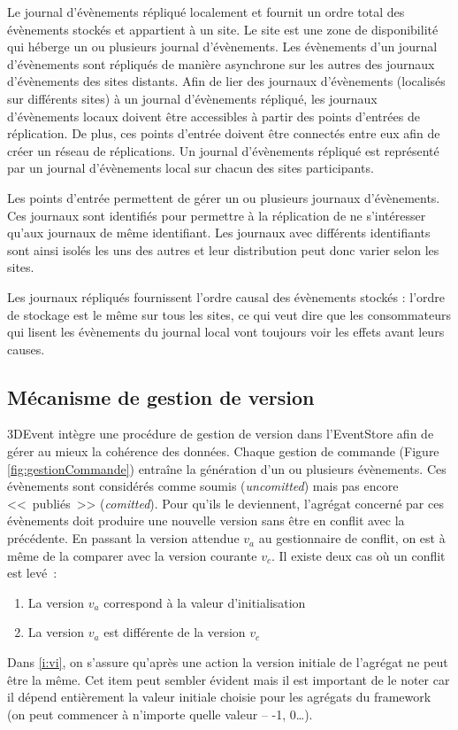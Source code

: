 Le journal d'évènements répliqué localement et fournit un ordre total des 
évènements stockés et appartient à un site. 
Le site est une zone de disponibilité qui héberge un ou plusieurs 
journal d'évènements. Les évènements d'un journal d'évènements sont 
répliqués de manière asynchrone sur les autres des journaux d'évènements 
des sites distants. 
Afin de lier des journaux d'évènements (localisés sur différents sites) à un journal 
d'évènements répliqué, les 
journaux d'évènements locaux doivent être accessibles à partir des points 
d'entrées de réplication. De plus, ces points d'entrée doivent être 
connectés entre eux afin de créer un réseau de réplications. 
Un journal d'évènements répliqué est représenté par un journal d'évènements local 
sur chacun des sites participants.


Les points d'entrée permettent de gérer un ou plusieurs journaux d'évènements. 
Ces journaux sont identifiés pour permettre à la réplication de ne s'intéresser 
qu'aux journaux de même identifiant. 
Les journaux avec différents identifiants sont ainsi isolés les uns des autres et 
leur distribution peut donc varier selon les sites.

Les journaux répliqués fournissent l'ordre causal des évènements stockés : l'ordre 
de stockage est le même sur tous les sites, ce qui veut dire que les 
consommateurs qui lisent les évènements du journal local vont toujours voir les 
effets avant leurs causes.




\subsection{Mécanisme de gestion de version}
3DEvent intègre une procédure de gestion de version dans l'\gls{EventStore} afin 
de gérer au mieux la cohérence des données. 
Chaque gestion de commande (Figure \ref{fig:gestionCommande}) entraîne la 
génération d'un ou plusieurs évènements. Ces évènements sont considérés 
comme \og soumis\fg{} (\textit{uncomitted}) mais pas encore <<~publiés~>> 
(\textit{comitted}).  Pour qu'ils le deviennent, l'agrégat concerné par ces 
évènements doit produire une nouvelle version sans être en conflit avec la 
précédente. En passant la version attendue $v_a$ au gestionnaire de conflit, on 
est à même de la comparer avec la version courante $v_c$. Il existe deux cas où 
un conflit est levé~: 
\begin{enumerate}[label=\alph*)]
	\item \label{i:vi} La version $v_a$ correspond à la valeur d'initialisation
	\item \label{i:vdiff} La version $v_a$ est différente de la version $v_c$
\end{enumerate}
Dans \ref{i:vi}, on s'assure qu'après une action la version initiale de l'agrégat ne 
peut être la même. Cet item peut sembler évident mais il est important de le noter 
car il dépend entièrement la valeur initiale choisie pour les agrégats du 
\gls{framework} (on peut commencer à n'importe quelle valeur -- -1, 0\ldots).



